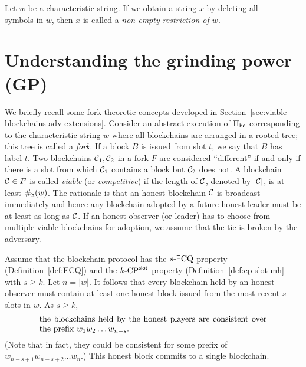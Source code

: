 Let $w$ be a characteristic string.
If we obtain a string $x$ by deleting all $\perp$ symbols in $w$, 
then $x$ is called a \emph{non-empty restriction of $w$}.







\section{Understanding the grinding power (GP)}

We briefly recall some fork-theoretic concepts
developed in Section~\ref{sec:viable-blockchains-adv-extensions}. 
Consider an abstract execution of $\Pi_\mathsf{bc}$ 
corresponding to the characteristic string $w$
where 
all blockchains are arranged in a rooted tree; 
this tree is called a \emph{fork}. 
If a block $B$ is issued from slot $t$, 
we say that $B$ has label $t$.
Two blockchains $\mathcal{C}_1, \mathcal{C}_2$ in a fork $F$ are considered ``different'' 
if and only if there is a slot from which 
$\mathcal{C}_1$ contains a block but $\mathcal{C}_2$ does not. 
A blockchain $\mathcal{C} \in F$ is called \emph{viable} (or \emph{competitive}) 
if the length of $\mathcal{C}$, denoted by $|\mathcal{C}|$, 
is at least $\#_{\mathtt{h}}(w)$. 
The rationale is that an honest blockchain $\mathcal{C}$ is broadcast immediately 
and hence any blockchain adopted by a future honest leader
must be at least as long as $\mathcal{C}$. 
If an honest observer (or leader) has to choose from multiple viable blockchains for adoption, 
we assume that the tie is broken by the adversary. 

Assume that the blockchain protocol 
has the ${s}\text{-}\exists\mathrm{CQ}$ property (Definition~\ref{def:ECQ}) 
and the ${k}\text{-}\mathrm{CP}^{\mathsf{slot}}$ property (Definition~\ref{def:cp-slot-mh} 
with $s \geq k$. 
Let $n = |w|$.
It follows that 
every blockchain held by an honest observer must contain 
at least one honest block 
issued from the most recent $s$ slots in $w$. 
As $s \geq k$, 
\begin{equation}
  \parbox{0.8\textwidth}{the blockchains held by the honest players 
    are consistent 
    over the prefix $w_1 w_2 \ldots w_{n-s}$.
  }
  \label{eq:last-honest-block-praos}
\end{equation}
(Note that in fact, they could be consistent for some prefix of $w_{n-s+1} w_{n-s+2} \ldots w_n$.)
This honest block commits to a single blockchain. 


